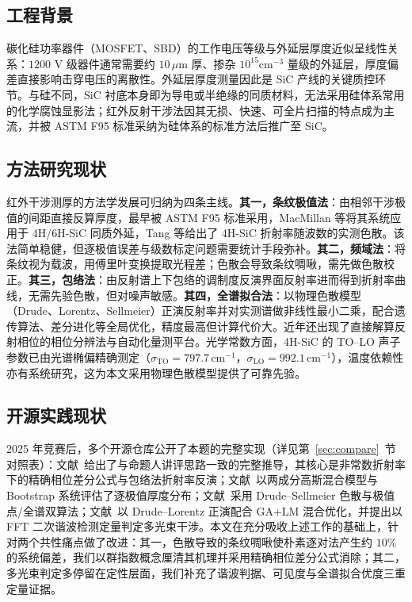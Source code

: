 \documentclass[11pt,a4paper,fontset=fandol]{ctexart}
\newcommand{\um}{\,\mu\mathrm{m}}
\newcommand{\invcm}{\,\mathrm{cm^{-1}}}
\begin{document}
\subsection{工程背景}

碳化硅功率器件（MOSFET、SBD）的工作电压等级与外延层厚度近似呈线性关系：$1200$ V 级器件通常需要约 $10\um$ 厚、掺杂 $10^{15}\mathrm{cm}^{-3}$ 量级的外延层，厚度偏差直接影响击穿电压的离散性。外延层厚度测量因此是 SiC 产线的关键质控环节。与硅不同，SiC 衬底本身即为导电或半绝缘的同质材料，无法采用硅体系常用的化学腐蚀显影法；红外反射干涉法因其无损、快速、可全片扫描的特点成为主流\cite{macmillan1998,tang2009}，并被 ASTM F95 标准采纳为硅体系的标准方法后推广至 SiC\cite{astmf95}。

\subsection{方法研究现状}

红外干涉测厚的方法学发展可归纳为四条主线。\textbf{其一，条纹极值法}：由相邻干涉极值的间距直接反算厚度，最早被 ASTM F95 标准采用\cite{astmf95}，MacMillan 等将其系统应用于 4H/6H-SiC 同质外延\cite{macmillan1998}，Tang 等给出了 4H-SiC 折射率随波数的实测色散\cite{tang2009}。该法简单稳健，但逐极值误差与级数标定问题需要统计手段弥补。\textbf{其二，频域法}：将条纹视为载波，用傅里叶变换提取光程差；色散会导致条纹啁啾，需先做色散校正\cite{fwsy2026}。\textbf{其三，包络法}：由反射谱上下包络的调制度反演界面反射率进而得到折射率曲线，无需先验色散，但对噪声敏感\cite{jiebro2025}。\textbf{其四，全谱拟合法}：以物理色散模型（Drude、Lorentz、Sellmeier）正演反射率并对实测谱做非线性最小二乘，配合遗传算法、差分进化等全局优化\cite{linjk2026,ccys2026}，精度最高但计算代价大。近年还出现了直接解算反射相位的相位分辨法\cite{li2026}与自动化量测平台\cite{liu2026}。光学常数方面，4H-SiC 的 TO--LO 声子参数已由光谱椭偏精确测定（$\sigma_{\mathrm{TO}}=797.7\invcm$，$\sigma_{\mathrm{LO}}=992.1\invcm$）\cite{madan2024}，温度依赖性亦有系统研究\cite{tong2018}，这为本文采用物理色散模型提供了可靠先验。

\subsection{开源实践现状}

2025 年竞赛后，多个开源仓库公开了本题的完整实现（详见第~\ref{sec:compare}~节对照表）：文献~\cite{jiebro2025}给出了与命题人讲评思路一致的完整推导，其核心是非常数折射率下的精确相位差分公式与包络法折射率反演；文献~\cite{schrodinger2026}以两成分高斯混合模型与 Bootstrap 系统评估了逐极值厚度分布；文献~\cite{skyler2026}采用 Drude--Sellmeier 色散与极值点/全谱双算法；文献~\cite{linjk2026}以 Drude--Lorentz 正演配合 GA$+$LM 混合优化，并提出以 FFT 二次谐波检测定量判定多光束干涉。本文在充分吸收上述工作的基础上，针对两个共性痛点做了改进：其一，色散导致的条纹啁啾使朴素逐对法产生约 $10\%$ 的系统偏差，我们以群指数概念厘清其机理并采用精确相位差分公式消除；其二，多光束判定多停留在定性层面，我们补充了谐波判据、可见度与全谱拟合优度三重定量证据。
\end{document}
